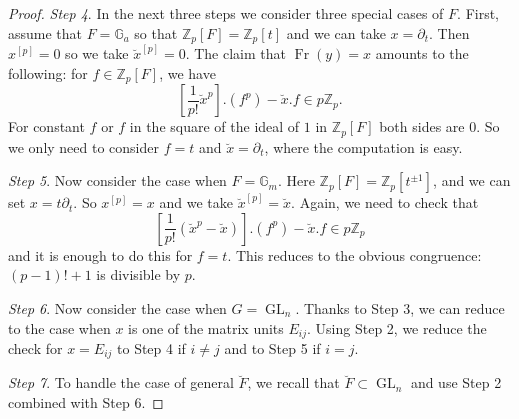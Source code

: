 \documentclass{amsart}
\newtheorem{Lem}[Thm]{Lemma}
\theoremstyle{definition}
\newcommand{\slf}{\mathfrak{sl}}
\newcommand{\Ring}{\mathsf{R}}
\newcommand{\g}{\mathfrak{g}}
\newcommand{\h}{\mathfrak{h}}
\newcommand{\Z}{\mathbb{Z}}
\numberwithin{equation}{section}
\begin{document}
\begin{proof}
{\it Step 4}. In the next three steps we consider three special cases of $F$. First, assume that $F=\mathbb{G}_a$ so that $\Z_p[F]=\Z_p[t]$ and we can take $x=\partial_t$.  Then $x^{[p]}=0$ so we take $\breve{x}^{[p]}=0$. The claim that $\operatorname{Fr}(y)=x$ amounts to the following: for $f\in \Z_p[F]$, we have 
$$[\frac{1}{p!}\breve{x}^p].(f^p)-\breve{x}.f\in p\Z_p.$$
For constant $f$ or $f$ in the square of the ideal of $1$ in $\Z_p[F]$ both sides are $0$. 
So we only need to consider $f=t$ and $\breve{x}=\partial_t$, where the computation is easy. 

{\it Step 5}. Now consider the case when $F=\mathbb{G}_m$. Here $\Z_p[F]=\Z_p[t^{\pm 1}]$, and we can set $x=t\partial_t$. So $x^{[p]}=x$ and we take $\breve{x}^{[p]}=\breve{x}$. Again, we need to check that 
$$[\frac{1}{p!}(\breve{x}^p-\breve{x})].(f^p)-\breve{x}.f\in p\Z_p$$
and it is enough to do this for $f=t$. This reduces to the obvious congruence: $(p-1)!+1$ is divisible by $p$.

{\it Step 6}. Now consider the case when $G=\operatorname{GL}_n$. Thanks to Step 3, we can reduce to the case when $x$ is one of the matrix units $E_{ij}$. Using Step 2, we reduce the check for $x=E_{ij}$ to Step 4 if $i\neq j$ and to Step 5 if $i=j$.

{\it Step 7}. To handle the case of general $\breve{F}$, we recall that $\breve{F}\subset \operatorname{GL}_n$ and use Step 2 combined with Step 6.
\end{proof}

%



\end{document}
